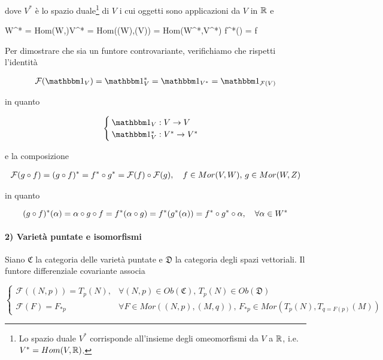 dove $ V^{*} $ è lo spazio duale\footnote{%
	Lo spazio duale $ V^{*} $ corrisponde all'insieme degli omeomorfismi da $ V $ a $ \mathbb{R} $, i.e. $ V^{*} = Hom(V,\mathbb{R}) $.%
} di $ V $ i cui oggetti sono applicazioni da $ V $ in $ \mathbb{R} $ e

	{W^{*} = Hom(W,\R)}{V^{*} = Hom((W),(V)) = Hom(W^{*},V^{*})}
	{\alpha}{f^{*}(\alpha) = \alpha \circ f}

Per dimostrare che sia un funtore controvariante, verifichiamo che rispetti l'identità

\begin{align}
	\mathcal{F}(\bigone_{V}) = \bigone_{V}^{*} %
	= \bigone_{V^{*}} %
	= \bigone_{\mathcal{F}(V)}
\end{align}

in quanto

\begin{equation}
	\begin{cases}
		\bigone_{V} : V \to V\\
		\bigone_{V}^{*} : V^{*} \to V^{*}
	\end{cases}
\end{equation}

e la composizione

\begin{align}
	\mathcal{F}(g \circ f) = (g \circ f)^{*} %
	= f^{*} \circ g^{*} %
	= \mathcal{F}(f) \circ \mathcal{F}(g) %
	\qcomma f \in Mor(V,W), \, g \in Mor(W,Z)
\end{align}

in quanto

\begin{equation}
	(g \circ f)^{*}(\alpha) = \alpha \circ g \circ f %
	= f^{*} (\alpha \circ g) %
	= f^{*} (g^{*}(\alpha)) %
	= f^{*} \circ g^{*} \circ \alpha %
	\qcomma \forall \alpha \in W^{*}
\end{equation}

\paragraph{2) Varietà puntate e isomorfismi}

Siano $ \mathfrak{C} $ la categoria delle varietà puntate e $ \mathfrak{D} $ la categoria degli spazi vettoriali. Il funtore differenziale covariante associa

\begin{equation}
	\begin{cases}
		\mathcal{F}((N,p)) = T_{p}(N), & \forall (N,p) \in Ob(\mathfrak{C}), \, T_{p}(N) \in Ob(\mathfrak{D}) \\
		\mathcal{F}(F) = F_{*p} & \forall F \in Mor((N,p),(M,q)), \, F_{*p} \in Mor(T_{p}(N),T_{q=F(p)}(M))
	\end{cases}
\end{equation}

